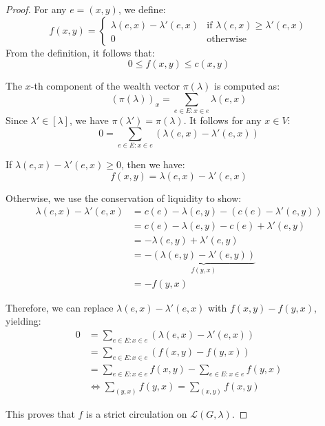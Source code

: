 \documentclass[10pt,twocolumn]{article}
\begin{document}
\begin{proof}
For any \(e = (x, y)\), we define:
\[
f(x, y) = 
\begin{cases}
    \lambda(e, x) - \lambda'(e, x) & \text{if } \lambda(e, x) \geq \lambda'(e, x) \\
    0 & \text{otherwise}
\end{cases}
\]
From the definition, it follows that:
\[
0 \leq f(x, y) \leq c(x, y)
\]

The \(x\)-th component of the wealth vector \(\pi(\lambda)\) is computed as:
\[
\left(\pi(\lambda)\right)_x = \sum_{e \in E: x \in e} \lambda(e, x)
\]
Since \(\lambda' \in [\lambda]\), we have \(\pi(\lambda') = \pi(\lambda)\). It follows for any \(x \in V\):
\[
0 = \sum_{e \in E: x \in e} \left(\lambda(e, x) - \lambda'(e, x)\right)
\]

If \(\lambda(e, x) - \lambda'(e, x) \geq 0\), then we have:
\[
f(x, y) = \lambda(e, x) - \lambda'(e, x)
\]

Otherwise, we use the conservation of liquidity to show:
\begin{equation*}
    \begin{split}
        \lambda(e, x) - \lambda'(e, x) &= c(e) - \lambda(e, y) - \left(c(e) - \lambda'(e, y)\right) \\
        &= c(e) - \lambda(e, y) - c(e) + \lambda'(e, y) \\
        &= -\lambda(e, y) + \lambda'(e, y) \\
        &= -\underbrace{\left(\lambda(e, y) - \lambda'(e, y)\right)}_{f(y, x)} \\
        &= -f(y, x)
    \end{split}
\end{equation*}

Therefore, we can replace \(\lambda(e, x) - \lambda'(e, x)\) with \(f(x, y) - f(y, x)\), yielding:
\begin{equation}
    \begin{split}
        0 &= \sum_{e \in E: x \in e} \left(\lambda(e, x) - \lambda'(e, x)\right) \\
        &= \sum_{e \in E: x \in e} \left(f(x, y) - f(y, x)\right) \\
        &= \sum_{e \in E: x \in e} f(x, y) - \sum_{e \in E: x \in e} f(y, x) \\
        &\Leftrightarrow \sum_{(y, x)} f(y, x) = \sum_{(x, y)} f(x, y)
    \end{split}
\end{equation}

This proves that \(f\) is a strict circulation on \(\mathcal{L}(G, \lambda)\).
\end{proof}
\end{document}
